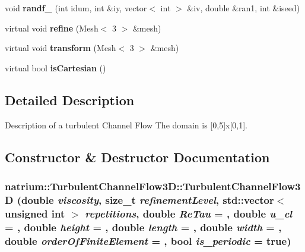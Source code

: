 \begin{DoxyCompactItemize}
\item 
\hypertarget{classnatrium_1_1TurbulentChannelFlow3D_aaa37441a5ea6a0f3e2ef534c24eabbfe}{
void {\bfseries randf\_} (int idum, int \&iy, vector$<$ int $>$ \&iv, double \&ran1, int \&iseed)}
\label{classnatrium_1_1TurbulentChannelFlow3D_aaa37441a5ea6a0f3e2ef534c24eabbfe}

\item 
\hypertarget{classnatrium_1_1TurbulentChannelFlow3D_a28a4340ffbf2044de9d99ba6b8c6c346}{
virtual void {\bfseries refine} (Mesh$<$ 3 $>$ \&mesh)}
\label{classnatrium_1_1TurbulentChannelFlow3D_a28a4340ffbf2044de9d99ba6b8c6c346}

\item 
\hypertarget{classnatrium_1_1TurbulentChannelFlow3D_a97bd4bdeeed7e5cb932b5bc9ed834d6b}{
virtual void {\bfseries transform} (Mesh$<$ 3 $>$ \&mesh)}
\label{classnatrium_1_1TurbulentChannelFlow3D_a97bd4bdeeed7e5cb932b5bc9ed834d6b}

\item 
\hypertarget{classnatrium_1_1TurbulentChannelFlow3D_a501115826adc04ab79636b50341fff42}{
virtual bool {\bfseries isCartesian} ()}
\label{classnatrium_1_1TurbulentChannelFlow3D_a501115826adc04ab79636b50341fff42}

\end{DoxyCompactItemize}


\subsection{Detailed Description}
Description of a turbulent Channel Flow The domain is \mbox{[}0,5\mbox{]}x\mbox{[}0,1\mbox{]}. 

\subsection{Constructor \& Destructor Documentation}
\hypertarget{classnatrium_1_1TurbulentChannelFlow3D_a5ffe8d8abb3209fffa0e96dc094e88fc}{
\subsubsection[{TurbulentChannelFlow3D}]{\setlength{\rightskip}{0pt plus 5cm}natrium::TurbulentChannelFlow3D::TurbulentChannelFlow3D (double {\em viscosity}, \/  size\_\-t {\em refinementLevel}, \/  std::vector$<$ unsigned int $>$ {\em repetitions}, \/  double {\em ReTau} = {}, \/  double {\em u\_\-cl} = {}, \/  double {\em height} = {}, \/  double {\em length} = {}, \/  double {\em width} = {}, \/  double {\em orderOfFiniteElement} = {}, \/  bool {\em is\_\-periodic} = {\ttfamily true})}}
\label{classnatrium_1_1TurbulentChannelFlow3D_a5ffe8d8abb3209fffa0e96dc094e88fc}


